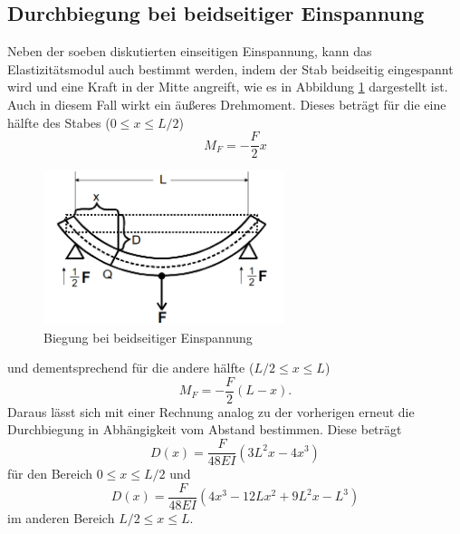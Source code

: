 \subsection{Durchbiegung bei beidseitiger Einspannung}
Neben der soeben diskutierten einseitigen Einspannung, kann das Elastizitätsmodul auch bestimmt werden, indem der Stab beidseitig eingespannt wird und eine Kraft
in der Mitte angreift, wie es in Abbildung \ref{fig:beidseitig} dargestellt ist. Auch in diesem Fall wirkt ein äußeres Drehmoment. Dieses beträgt für die eine hälfte des Stabes ($0\leq x \leq L/2$)
\begin{equation*}
M_F=-\frac{F}{2}x
\end{equation*}
\begin{figure}
\centering
\includegraphics[width=7cm, keepaspectratio]{Biegung beidseitig}
\caption{Biegung bei beidseitiger Einspannung}
\label{fig:beidseitig}
\end{figure}
und dementsprechend für die andere hälfte ($L/2\leq x \leq L$)
\begin{equation*}
M_F=-\frac{F}{2}(L-x).
\end{equation*}
Daraus lässt sich mit einer Rechnung analog zu der vorherigen erneut die Durchbiegung in Abhängigkeit vom Abstand bestimmen. Diese beträgt
\begin{equation}
D(x)=\frac{F}{48EI}(3L^2x-4x^3)
\end{equation}
für den Bereich $0\leq x \leq L/2$ und 
\begin{equation}
D(x)=\frac{F}{48EI}(4x^3-12Lx^2+9L^2x-L^3)
\end{equation}
im anderen Bereich $L/2\leq x \leq L$.
